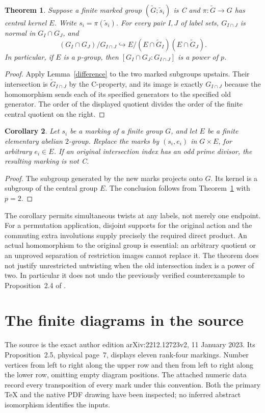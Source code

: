 \documentclass[a4paper,11pt]{article}
\newtheorem{theorem}{Theorem}
\newtheorem{corollary}[theorem]{Corollary}
\begin{document}
\begin{theorem}\label{obstruction}
Suppose a finite marked group $(\widetilde G;\widetilde s_i)$ is C
and $\pi:\widetilde G\to G$ has central kernel $E$. Write
$s_i=\pi(\widetilde s_i)$. For every pair $I,J$ of label sets,
$G_{I\cap J}$ is normal in $G_I\cap G_J$, and
\[
        (G_I\cap G_J)/G_{I\cap J}
        \hookrightarrow E/(E\cap\widetilde G_I)(E\cap\widetilde G_J).
\]
In particular, if $E$ is a $p$-group, then
$[G_I\cap G_J:G_{I\cap J}]$ is a power of $p$.
\end{theorem}
\begin{proof}
Apply Lemma~\ref{difference} to the two marked subgroups upstairs.
Their intersection is $\widetilde G_{I\cap J}$ by the C-property,
and its image is exactly $G_{I\cap J}$ because the homomorphism
sends each of its specified generators to the specified old generator.
The order of the displayed quotient divides the order of the finite
central quotient on the right.
\end{proof}

\begin{corollary}\label{twists}
Let $s_i$ be a marking of a finite group $G$, and let $E$ be a finite
elementary abelian $2$-group. Replace the marks by $(s_i,e_i)$ in
$G\times E$, for arbitrary $e_i\in E$. If an original intersection
index has an odd prime divisor, the resulting marking is not C.
\end{corollary}
\begin{proof}
The subgroup generated by the new marks projects onto $G$. Its kernel
is a subgroup of the central group $E$. The conclusion follows from
Theorem~\ref{obstruction} with $p=2$.
\end{proof}

The corollary permits simultaneous twists at any labels, not merely one
endpoint. For a permutation application, disjoint supports for the original
action and the commuting extra involutions supply precisely the required
direct product. An actual homomorphism to the original group is essential:
an arbitrary quotient or an unproved separation of restriction images
cannot replace it. The theorem does not justify unrestricted untwisting
when the old intersection index is a power of two. In particular it does
not undo the previously verified counterexample to Proposition~2.4 of
\cite{source}.

\section{The finite diagrams in the source}
The source is the exact author edition arXiv:2212.12723v2, 11 January
2023. Its Proposition~2.5, physical page~7, displays eleven rank-four
markings. Number vertices from left to right along the upper row and then
from left to right along the lower row, omitting empty diagram positions.
The attached numeric data record every transposition of every mark under
this convention. Both the primary TeX and the native PDF drawing have
been inspected; no inferred abstract isomorphism identifies the inputs.
\end{document}
